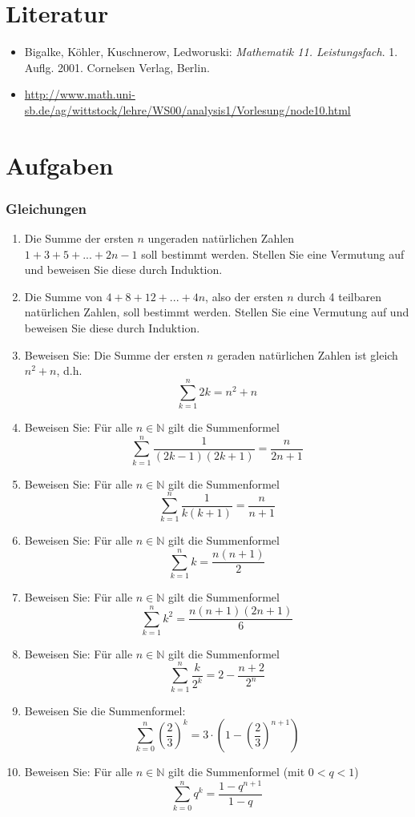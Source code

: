 \section{Literatur}
\begin{itemize}
	\item Bigalke, Köhler, Kuschnerow, Ledworuski: \textit{Mathematik 11. Leistungsfach}. 1. Auflg. 2001. Cornelsen Verlag, Berlin.
	\item \url{http://www.math.uni-sb.de/ag/wittstock/lehre/WS00/analysis1/Vorlesung/node10.html}
\end{itemize}
\section{Aufgaben}
\subsubsection{Gleichungen}
\begin{enumerate}
	\item Die Summe der ersten $ n $ ungeraden natürlichen Zahlen $ 1 + 3 + 5 + ... + 2n-1 $ soll bestimmt werden. Stellen Sie eine Vermutung auf und beweisen Sie diese durch Induktion.
	\item Die Summe von $ 4 + 8 + 12 + ... + 4n $, also der ersten $ n $ durch 4 teilbaren natürlichen Zahlen, soll bestimmt werden. Stellen Sie eine Vermutung auf und beweisen Sie diese durch Induktion.
	\item Beweisen Sie: Die Summe der ersten $ n $ geraden natürlichen Zahlen ist gleich $ n^2 + n $, d.h. 
		\[ \sum_{k=1}^{n} 2k = n^2 + n \]
	\item Beweisen Sie: Für alle $ n \in \mathbb{N} $ gilt die Summenformel 
		\[\sum^n_{k=1} \frac{1}{(2k-1)(2k+1)} = \frac{n}{2n + 1} \]
	\item Beweisen Sie: Für alle $ n \in \mathbb{N} $ gilt die Summenformel
		\[\sum^n_{k=1} \frac{1}{k(k+1)} = \frac{n}{n+1} \]
	\item Beweisen Sie: Für alle $ n \in \mathbb{N} $ gilt die Summenformel
		\[\sum^n_{k=1} k = \frac{n(n+1)}{2} \]
	\item Beweisen Sie: Für alle $ n \in \mathbb{N} $ gilt die Summenformel
		\[\sum_{k=1}^n k^2 = \frac{n(n+1)(2n+1)}{6} \]
	\item Beweisen Sie: Für alle $ n \in \mathbb{N} $ gilt die Summenformel
		\[\sum_{k=1}^n \frac{k}{2^k} = 2 - \frac{n+2}{2^n} \]
	\item Beweisen Sie die Summenformel:
		\[\sum_{k=0}^n \left(\frac{2}{3}\right)^k = 3 \cdot \left(1 - \left(\frac{2}{3}\right)^{n+1}\right) \]
	\item Beweisen Sie: Für alle $ n \in \mathbb{N} $ gilt die Summenformel (mit $ 0 < q < 1 $)
		\[\sum_{k=0}^n q^k = \frac{1 - q^{n+1}}{1 - q} \]
\end{enumerate}
